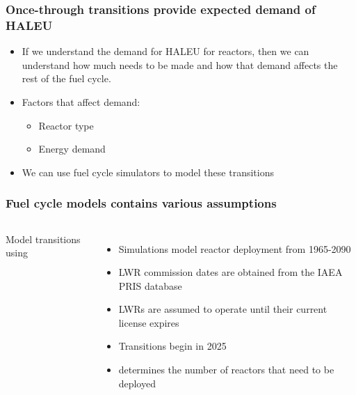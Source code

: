 \begin{frame}
    \frametitle{Once-through transitions provide expected demand of \gls{HALEU}}
        \begin{itemize}
            \item If we understand the demand for \gls{HALEU} for reactors, 
            then we can understand how much needs to be made and how that 
            demand affects the rest of the fuel cycle. 
            \pause
            \item Factors that affect demand:
            \begin{itemize}
                \item Reactor type
                \item Energy demand
            \end{itemize}
            \pause
            \item We can use fuel cycle simulators to model these transitions
        \end{itemize}
\end{frame}

\begin{frame}
    \frametitle{Fuel cycle models contains various assumptions}
    \begin{columns}
        
    \column[t]{6cm}
    \vspace{-0.9cm}
    

        \column[t]{4.5cm}
        Model transitions using \Cyclus \cite{huff_fundamental_2016}
    \begin{itemize}
        \item Simulations model reactor deployment from 1965-2090
        \item<2-> \gls{LWR} commission dates are obtained from the IAEA PRIS
              database \cite{noauthor_power_1989}
        \item<2-> \glspl{LWR} are assumed to operate until their current license 
              expires
        \item<3-> Transitions begin in 2025
        \item<3-> \Cyclus determines the number of reactors that need to be deployed
    \end{itemize}

\end{columns}
\end{frame}

